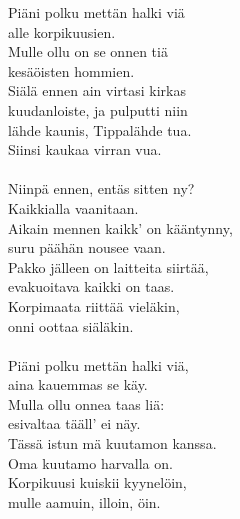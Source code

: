 
            Piäni polku mettän halki viä \\
            alle korpikuusien. \\
            Mulle ollu on se onnen tiä \\
            kesäöisten hommien. \\
            Siälä ennen ain virtasi kirkas \\
            kuudanloiste, ja pulputti niin \\
            lähde kaunis, Tippalähde tua. \\
            Siinsi kaukaa virran vua. \\
\hspace{10mm} \\
            Niinpä ennen, entäs sitten ny? \\
            Kaikkialla vaanitaan. \\
            Aikain mennen kaikk' on kääntynny, \\
            suru päähän nousee vaan. \\
            Pakko jälleen on laitteita siirtää, \\
            evakuoitava kaikki on taas. \\
            Korpimaata riittää vieläkin, \\
            onni oottaa siäläkin. \\
\hspace{10mm} \\
            Piäni polku mettän halki viä, \\
            aina kauemmas se käy. \\
            Mulla ollu onnea taas liä: \\
            esivaltaa tääll’ ei näy. \\
            Tässä istun mä kuutamon kanssa. \\
            Oma kuutamo harvalla on. \\
            Korpikuusi kuiskii kyynelöin, \\
            mulle aamuin, illoin, öin. \\
